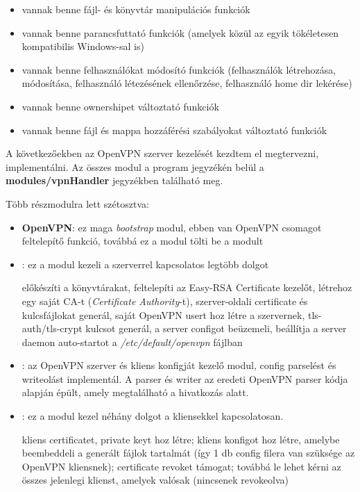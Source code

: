 \begin{itemize}
	\item vannak benne fájl- és könyvtár manipulációs funkciók
	\item vannak benne parancsfuttató funkciók (amelyek közül az egyik tökéletesen kompatibilis Windows-sal is)
	\item vannak benne felhasználókat módosító funkciók (felhasználók létrehozása, módosítása, felhasználó létezésének ellenőrzése, felhasználó home dir lekérése)
	\item vannak benne ownershipet változtató funkciók
	\item vannak benne fájl és mappa hozzáférési szabályokat változtató funkciók
\end{itemize}

\pagebreak


A következőekben az OpenVPN szerver kezelését kezdtem el megtervezni, implementálni. Az összes modul a program jegyzékén belül a \textbf{modules/vpnHandler} jegyzékben található meg.

Több részmodulra lett szétosztva:
\begin{itemize}
	\item \textbf{OpenVPN}: ez maga \textit{bootstrap} modul, ebben van OpenVPN csomagot feltelepítő funkció, továbbá ez a modul tölti be a \textit{} modult
	\item \textbf{}: ez a modul kezeli a szerverrel kapcsolatos legtöbb dolgot
	
	előkészíti a könyvtárakat, feltelepíti az Easy-RSA Certificate kezelőt, létrehoz egy saját CA-t (\textit{Certificate Authority}-t), szerver-oldali certificate és kulcsfájlokat generál, saját OpenVPN usert hoz létre a szervernek, tls-auth/tls-crypt kulcsot generál, a server configot beüzemeli, beállítja a server daemon auto-startot a \textit{/etc/default/openvpn} fájlban

	\item \textbf{}: az OpenVPN szerver és kliens konfigját kezelő modul, config parselést és writeolást implementál. A parser és writer az eredeti OpenVPN parser kódja alapján épült, amely megtalálható a \cite{openvpn_parser} hivatkozás alatt.
	\item \textbf{}: ez a modul kezel néhány dolgot a kliensekkel kapcsolatosan.
	
	kliens certificatet, private keyt hoz létre; kliens konfigot hoz létre, amelybe beembeddeli a generált fájlok tartalmát (így 1 db config filera van szüksége az OpenVPN kliensnek); certificate revoket támogat; továbbá le lehet kérni az összes jelenlegi klienst, amelyek valósak (nincsenek revokeolva)
\end{itemize}

